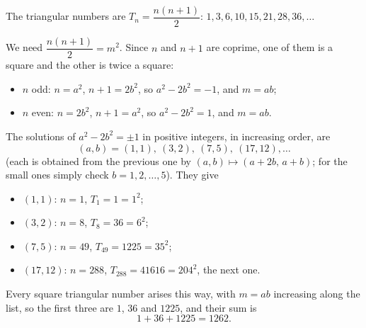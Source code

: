 The triangular numbers are $T_n=\dfrac{n(n+1)}{2}$: $1,3,6,10,15,21,28,36,\dots$

We need $\dfrac{n(n+1)}{2}=m^2$. Since $n$ and $n+1$ are coprime, one of them is a square and the other is twice a square:
\begin{itemize}
\item $n$ odd: $n=a^2$, $n+1=2b^2$, so $a^2-2b^2=-1$, and $m=ab$;
\item $n$ even: $n=2b^2$, $n+1=a^2$, so $a^2-2b^2=1$, and $m=ab$.
\end{itemize}
The solutions of $a^2-2b^2=\pm1$ in positive integers, in increasing order, are
\[
(a,b)=(1,1),\ (3,2),\ (7,5),\ (17,12),\dots
\]
(each is obtained from the previous one by $(a,b)\mapsto(a+2b,\,a+b)$; for the small ones simply check $b=1,2,\dots,5$). They give
\begin{itemize}
\item $(1,1)$: $n=1$, $T_1=1=1^2$;
\item $(3,2)$: $n=8$, $T_8=36=6^2$;
\item $(7,5)$: $n=49$, $T_{49}=1225=35^2$;
\item $(17,12)$: $n=288$, $T_{288}=41616=204^2$, the next one.
\end{itemize}
Every square triangular number arises this way, with $m=ab$ increasing along the list, so the first three are $1$, $36$ and $1225$, and their sum is
\[
1+36+1225=\boxed{1262}.
\]
